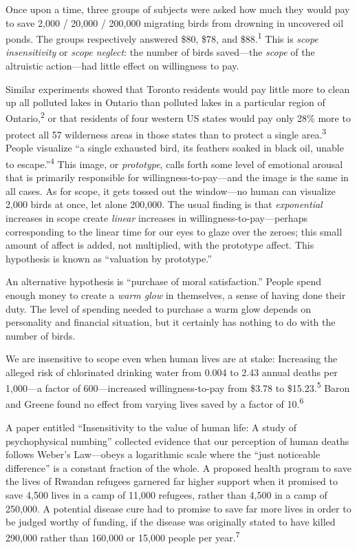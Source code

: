 
{
 Once upon a time, three groups of subjects were asked how much
they would pay to save 2,000 / 20,000 / 200,000 migrating birds from
drowning in uncovered oil ponds. The groups respectively answered \$80,
\$78, and \$88.\textsuperscript{1} This is \textit{scope insensitivity}
or \textit{scope neglect}: the number of birds saved---the
\textit{scope} of the altruistic action---had little effect on
willingness to pay. }

{
 Similar experiments showed that Toronto residents would pay little
more to clean up all polluted lakes in Ontario than polluted lakes in a
particular region of Ontario,\textsuperscript{2} or that residents of
four western US states would pay only 28\% more to protect all 57
wilderness areas in those states than to protect a single
area.\textsuperscript{3} People visualize ``a single
exhausted bird, its feathers soaked in black oil, unable to
escape.''\textsuperscript{4} This image, or
\textit{prototype}, calls forth some level of emotional arousal that is
primarily responsible for willingness-to-pay---and the image is the
same in all cases. As for scope, it gets tossed out the window---no
human can visualize 2,000 birds at once, let alone 200,000. The usual
finding is that \textit{exponential} increases in scope create
\textit{linear} increases in willingness-to-pay---perhaps corresponding
to the linear time for our eyes to glaze over the zeroes; this small
amount of affect is added, not multiplied, with the prototype affect.
This hypothesis is known as ``valuation by
prototype.''}

{
 An alternative hypothesis is ``purchase of moral
satisfaction.'' People spend enough money to create a
\textit{warm glow} in themselves, a sense of having done their duty.
The level of spending needed to purchase a warm glow depends on
personality and financial situation, but it certainly has nothing to do
with the number of birds.}

{
 We are insensitive to scope even when human lives are at stake:
Increasing the alleged risk of chlorinated drinking water from 0.004 to
2.43 annual deaths per 1,000---a factor of 600---increased
willingness-to-pay from \$3.78 to \$15.23.\textsuperscript{5} Baron and
Greene found no effect from varying lives saved by a factor of
10.\textsuperscript{6}}

{
 A paper entitled ``Insensitivity to the value of
human life: A study of psychophysical numbing''
collected evidence that our perception of human deaths follows
Weber's Law---obeys a logarithmic scale where the
``just noticeable difference'' is a
constant fraction of the whole. A proposed health program to save the
lives of Rwandan refugees garnered far higher support when it promised
to save 4,500 lives in a camp of 11,000 refugees, rather than 4,500 in
a camp of 250,000. A potential disease cure had to promise to save far
more lives in order to be judged worthy of funding, if the disease was
originally stated to have killed 290,000 rather than 160,000 or 15,000
people per year.\textsuperscript{7}}

